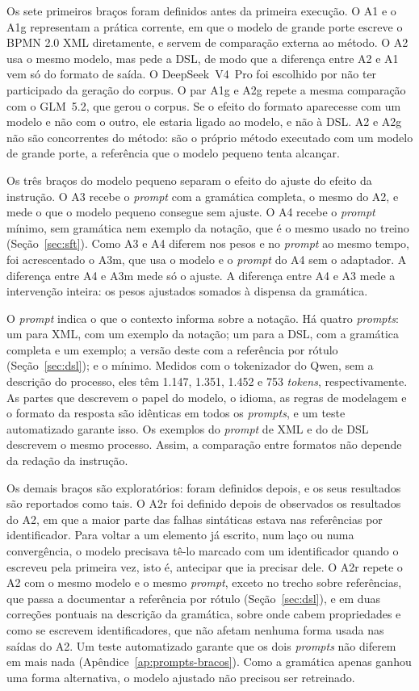 Os sete primeiros braços foram definidos antes da primeira execução. O A1 e o A1g representam a prática corrente, em que o modelo de grande porte escreve o BPMN 2.0 XML diretamente, e servem de comparação externa ao método. O A2 usa o mesmo modelo, mas pede a DSL, de modo que a diferença entre A2 e A1 vem só do formato de saída. O DeepSeek~V4~Pro foi escolhido por não ter participado da geração do corpus. O par A1g e A2g repete a mesma comparação com o GLM~5.2, que gerou o corpus. Se o efeito do formato aparecesse com um modelo e não com o outro, ele estaria ligado ao modelo, e não à DSL. A2 e A2g não são concorrentes do método: são o próprio método executado com um modelo de grande porte, a referência que o modelo pequeno tenta alcançar.

Os três braços do modelo pequeno separam o efeito do ajuste do efeito da instrução. O A3 recebe o \textit{prompt} com a gramática completa, o mesmo do A2, e mede o que o modelo pequeno consegue sem ajuste. O A4 recebe o \textit{prompt} mínimo, sem gramática nem exemplo da notação, que é o mesmo usado no treino (Seção~\ref{sec:sft}). Como A3 e A4 diferem nos pesos e no \textit{prompt} ao mesmo tempo, foi acrescentado o A3m, que usa o modelo e o \textit{prompt} do A4 sem o adaptador. A diferença entre A4 e A3m mede só o ajuste. A diferença entre A4 e A3 mede a intervenção inteira: os pesos ajustados somados à dispensa da gramática.

O \textit{prompt} indica o que o contexto informa sobre a notação. Há quatro \textit{prompts}: um para XML, com um exemplo da notação; um para a DSL, com a gramática completa e um exemplo; a versão deste com a referência por rótulo (Seção~\ref{sec:dsl}); e o mínimo. Medidos com o tokenizador do Qwen, sem a descrição do processo, eles têm 1.147, 1.351, 1.452 e 753 \textit{tokens}, respectivamente. As partes que descrevem o papel do modelo, o idioma, as regras de modelagem e o formato da resposta são idênticas em todos os \textit{prompts}, e um teste automatizado garante isso. Os exemplos do \textit{prompt} de XML e do de DSL descrevem o mesmo processo. Assim, a comparação entre formatos não depende da redação da instrução.

Os demais braços são exploratórios: foram definidos depois, e os seus resultados são reportados como tais. O A2r foi definido depois de observados os resultados do A2, em que a maior parte das falhas sintáticas estava nas referências por identificador. Para voltar a um elemento já escrito, num laço ou numa convergência, o modelo precisava tê-lo marcado com um identificador quando o escreveu pela primeira vez, isto é, antecipar que ia precisar dele. O A2r repete o A2 com o mesmo modelo e o mesmo \textit{prompt}, exceto no trecho sobre referências, que passa a documentar a referência por rótulo (Seção~\ref{sec:dsl}), e em duas correções pontuais na descrição da gramática, sobre onde cabem propriedades e como se escrevem identificadores, que não afetam nenhuma forma usada nas saídas do A2. Um teste automatizado garante que os dois \textit{prompts} não diferem em mais nada (Apêndice~\ref{ap:prompts-bracos}). Como a gramática apenas ganhou uma forma alternativa, o modelo ajustado não precisou ser retreinado.


